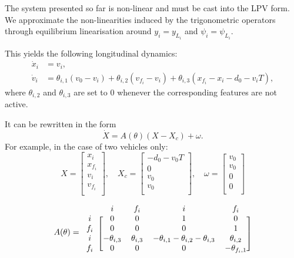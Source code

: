\documentclass{article}
\begin{document}
The system presented so far is non-linear and must be cast into the LPV form. We approximate the non-linearities induced by the trigonometric operators through equilibrium linearisation around $y_i=y_{L_i}$ and $\psi_i=\psi_{L_i}$.

This yields the following longitudinal dynamics:
\begin{align*}
\dot{x}_i &= v_i,\\
\dot v_i &= \theta_{i,1} (v_0 - v_i) + \theta_{i,2} (v_{f_i} - v_i) + \theta_{i,3}(x_{f_i} - x_i - d_0 - v_i T),
\end{align*}
where $\theta_{i,2}$ and $\theta_{i,3}$ are set to $0$ whenever the corresponding features are not active.

It can be rewritten in the form $$\dot{X} = A(\theta)(X-X_c) + \omega.$$ For example, in the case of two vehicles only:
\begin{equation*}
X = \begin{bmatrix}
x_i \\
x_{f_i} \\
v_i \\
v_{f_i} \\
\end{bmatrix}
,\quad
X_c = \begin{bmatrix}
-d_0-v_0 T \\
0 \\
v_0\\
v_0 \\
\end{bmatrix}
,\quad
\omega = \begin{bmatrix}
v_0 \\
v_0 \\
0\\
0\\
\end{bmatrix}
\end{equation*}

\begin{equation*}
A(\theta)
=
\begin{blockarray}{ccccc}
& i & f_i & i & f_i \\
\begin{block}{c[cccc]}
i & 0 & 0 & 1 & 0 \\
f_i & 0 & 0 & 0 & 1 \\
i & -\theta_{i,3} & \theta_{i,3} & -\theta_{i,1}-\theta_{i,2}-\theta_{i,3} & \theta_{i,2} \\
f_i & 0 & 0 & 0 & -\theta_{f_i,1} \\
\end{block}
\end{blockarray}
\end{equation*}
\end{document}
